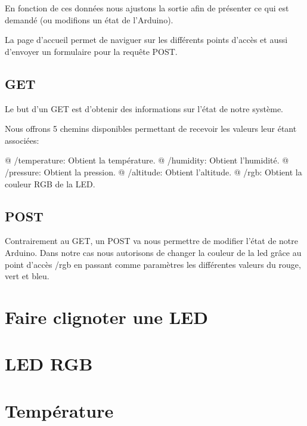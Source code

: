 \documentclass{report}
\begin{document}
		En fonction de ces données nous ajustons la sortie afin de présenter ce qui est demandé (ou modifions un état de l'Arduino).
		
		La page d'accueil permet de naviguer sur les différents points d'accès et aussi d'envoyer un formulaire pour la requête POST.
		
		
		\section{GET}
			Le but d'un GET est d'obtenir des informations sur l'état de notre système.
			
			Nous offrons 5 chemins disponibles permettant de recevoir les valeurs leur étant associées:
			\begin{easylist}
				@ /temperature: Obtient la température.
				@ /humidity: Obtient l'humidité.
				@ /pressure: Obtient la pression.
				@ /altitude: Obtient l'altitude.
				@ /rgb: Obtient la couleur RGB de la LED.
			\end{easylist}
		
		\section{POST}
			Contrairement au GET, un POST va nous permettre de modifier l'état de notre Arduino.
			Dans notre cas nous autorisons de changer la couleur de la led grâce au point d'accès /rgb en passant comme paramètres les différentes valeurs du rouge, vert et bleu.
  		
\appendix
	\chapter{Faire clignoter une LED\label{code:led}}
		
			
	\chapter{LED RGB\label{code:rgb}}
		
			
	\chapter{Température\label{code:temp}}
		
			
\end{document}
